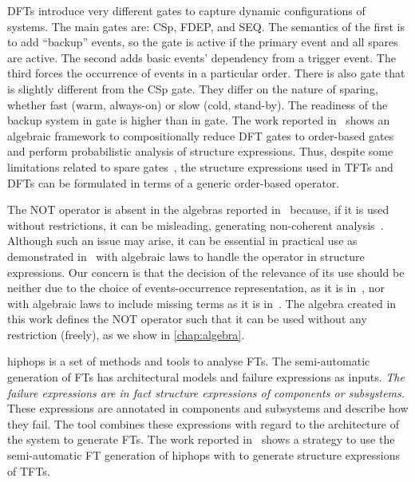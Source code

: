 \Acp{DFT} introduce very different gates to capture dynamic configurations of systems.
The main gates are: \ac{CSp}, \ac{FDEP}, and \ac{SEQ}.
The semantics of the first is to add ``backup'' events, so the gate is active if the primary event and all spares are active.
The second adds basic events' dependency from a trigger event.
The third forces the occurrence of events in a particular order.
There is also  gate that is slightly different from the \ac{CSp} gate.
They differ on the nature of sparing, whether fast (warm, always-on) or slow (cold, stand-by).
The readiness of the backup system in  gate is higher than in  gate.
The work reported in~\cite{MRL2011} shows an algebraic framework to compositionally reduce \ac{DFT} gates to order-based gates and perform probabilistic analysis of structure expressions. Thus, despite some limitations related to spare gates~\cite{MRL2014}, the structure expressions used in \acp{TFT} and \acp{DFT} can be formulated in terms of a generic order-based operator.

\begin{sloppypar}
The \ac{NOT} operator is absent in the algebras reported in~\cite{WP2009,Walker2009,Merle2010,MRL2011b} because,
if it is used without restrictions, it can be misleading, generating non-coherent analysis~\cite{Oliv2006}.
Although such an issue may arise, it can be essential in practical use as demonstrated in~\cite{Andrews2001} with algebraic laws to handle the operator in structure expressions.
%
Our concern is that the decision of the relevance of its use should be neither due to the choice of events-occurrence representation, as it is in~\cite{WP2009,Walker2009,Merle2010,MRL2011b}, nor with algebraic laws to include missing terms as it is in~\cite{Andrews2001}.
The algebra created in this work defines the \ac{NOT} operator such that it can be used without any restriction (freely), as we show in \cref{chap:algebra}.
\end{sloppypar}

\begin{sloppypar}
\Ac{hiphops} is a set of methods and tools to analyse \acp{FT}.
The semi-automatic generation of \acp{FT} has architectural models and failure expressions as inputs.
\emph{The failure expressions are in fact structure expressions of components or subsystems.}
These expressions are annotated in components and subsystems and describe how they fail.
The tool combines these expressions with regard to the architecture of the system to generate \acp{FT}.
The work reported in~\cite{WP2008} shows a strategy to use the semi-automatic \ac{FT} generation of \ac{hiphops} with \pandora to generate structure expressions of \acp{TFT}.
\end{sloppypar}

